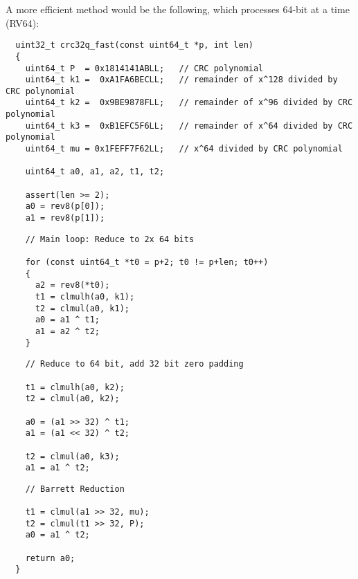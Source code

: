 A more efficient method would be the following, which processes 64-bit at a
time (RV64):

\begin{minipage}{\linewidth}
\begin{verbatim}
  uint32_t crc32q_fast(const uint64_t *p, int len)
  {
    uint64_t P  = 0x1814141ABLL;   // CRC polynomial
    uint64_t k1 =  0xA1FA6BECLL;   // remainder of x^128 divided by CRC polynomial
    uint64_t k2 =  0x9BE9878FLL;   // remainder of x^96 divided by CRC polynomial
    uint64_t k3 =  0xB1EFC5F6LL;   // remainder of x^64 divided by CRC polynomial
    uint64_t mu = 0x1FEFF7F62LL;   // x^64 divided by CRC polynomial

    uint64_t a0, a1, a2, t1, t2;

    assert(len >= 2);
    a0 = rev8(p[0]);
    a1 = rev8(p[1]);
\end{verbatim}
\end{minipage}

\begin{minipage}{\linewidth}
\begin{verbatim}
    // Main loop: Reduce to 2x 64 bits

    for (const uint64_t *t0 = p+2; t0 != p+len; t0++)
    {
      a2 = rev8(*t0);
      t1 = clmulh(a0, k1);
      t2 = clmul(a0, k1);
      a0 = a1 ^ t1;
      a1 = a2 ^ t2;
    }
\end{verbatim}
\end{minipage}

\begin{minipage}{\linewidth}
\begin{verbatim}
    // Reduce to 64 bit, add 32 bit zero padding

    t1 = clmulh(a0, k2);
    t2 = clmul(a0, k2);

    a0 = (a1 >> 32) ^ t1;
    a1 = (a1 << 32) ^ t2;

    t2 = clmul(a0, k3);
    a1 = a1 ^ t2;
\end{verbatim}
\end{minipage}

\begin{minipage}{\linewidth}
\begin{verbatim}
    // Barrett Reduction

    t1 = clmul(a1 >> 32, mu);
    t2 = clmul(t1 >> 32, P);
    a0 = a1 ^ t2;

    return a0;
  }
\end{verbatim}
\end{minipage}

